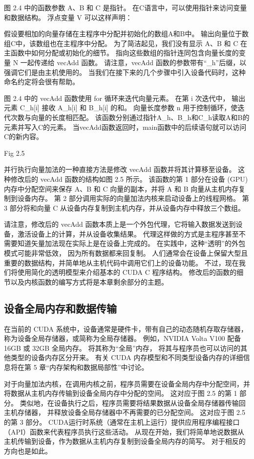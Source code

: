\begin{remark}[C语言中的指针]
	图 2.4 中的函数参数 A、B 和 C 是指针。 在C语言中，可以使用指针来访问变量和数据结构。 浮点变量 V 可以这样声明：
\end{remark}

假设要相加的向量存储在主程序中分配并初始化的数组A和B中。 输出向量位于数组C中，该数组也在主程序中分配。 
为了简洁起见，我们没有显示 A、B 和 C 在主函数中如何分配或初始化的细节。 
指向这些数组的指针连同包含向量长度的变量 N 一起传递给 vecAdd 函数。 
请注意，vecAdd 函数的参数带有“\_h”后缀，以强调它们是由主机使用的。 
当我们在接下来的几个步骤中引入设备代码时，这种命名约定将会很有帮助。

图 2.4 中的 vecAdd 函数使用 for 循环来迭代向量元素。 在第 i 次迭代中，
输出元素 C\_h[i] 接收 A\_h[i] 和 B\_h[i] 的和。 向量长度参数 n 用于控制循环，使迭代次数与向量的长度相匹配。 
该函数分别通过指针A\_h、B\_h和C\_h读取A和B的元素并写入C的元素。 
当vecAdd函数返回时，main函数中的后续语句就可以访问C的新内容。

{\color{red} Fig 2.5}

并行执行向量加法的一种直接方法是修改 vecAdd 函数并将其计算移至设备。 这种修改后的 vecAdd 函数的结构如图 2.5 所示。 
该函数的第 1 部分在设备 (GPU) 内存中分配空间来保存 A、B 和 C 向量的副本，并将 A 和 B 向量从主机内存复制到设备内存。 
第 2 部分调用实际的向量加法内核来启动设备上的线程网格。 
第 3 部分将和向量 C 从设备内存复制到主机内存，并从设备内存中释放三个数组。

请注意，修改后的 vecAdd 函数本质上是一个外包代理，它将输入数据发送到设备，激活设备上的计算，并从设备收集结果。 
代理这样做的方式是主程序甚至不需要知道矢量加法现在实际上是在设备上完成的。 在实践中，这种“透明”的外包模式可能非常低效，
因为所有数据都来回复制。 人们通常会在设备上保留大型且重要的数据结构，并简单地从主机代码中调用它们上的设备功能。 
不过，现在我们将使用简化的透明模型来介绍基本的 CUDA C 程序结构。 
修改后的函数的细节以及内核函数的编写方式将是本章剩余部分的主题。

\subsection{设备全局内存和数据传输}
在当前的 CUDA 系统中，设备通常是硬件卡，带有自己的动态随机存取存储器，称为设备全局存储器，或简称为全局存储器。 
例如，NVIDIA Volta V100 配备 16GB 或 32GB 全局内存。 将其称为“全局”内存，
将其与程序员也可以访问的其他类型的设备内存区分开来。 
有关 CUDA 内存模型和不同类型设备内存的详细信息将在第 5 章“内存架构和数据局部性”中讨论。

对于向量加法内核，在调用内核之前，程序员需要在设备全局内存中分配空间，并将数据从主机内存传输到设备全局内存中分配的空间。 
这对应于图 2.5 的第 1 部分。 类似地，在设备执行之后，程序员需要将结果数据从设备全局存储器传输回主机存储器，
并释放设备全局存储器中不再需要的已分配空间。 这对应于图 2.5 的第 3 部分。 
CUDA运行时系统（通常在主机上运行）提供应用程序编程接口（API）函数来代表程序员执行这些活动。 
从现在开始，我们将简单地说数据从主机传输到设备，作为数据从主机内存复制到设备全局内存的简写。 对于相反的方向也是如此。

